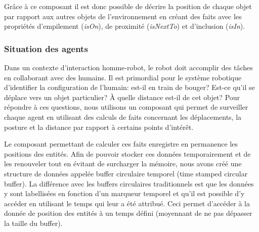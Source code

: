 \documentclass[a4paper,11pt,twoside]{StyleThese}
\begin{document}
Grâce à ce composant il est donc possible de décrire la position de chaque objet par rapport aux autres objets de l'environnement en créant des faits avec les propriétés d'empilement (\textit{isOn}), de proximité (\textit{isNextTo}) et d'inclusion (\textit{isIn}). 

\subsubsection{Situation des agents}
\label{sec:situationAgents}

Dans un contexte d'interaction homme-robot, le robot doit accomplir des tâches en collaborant avec des humains. Il est primordial pour le système robotique d'identifier la configuration de l'humain: est-il en train de bouger? Est-ce qu'il se déplace vers un objet particulier? À quelle distance est-il de cet objet? Pour répondre à ces questions, nous utilisons un composant qui permet de surveiller chaque agent en utilisant des calculs de faits concernant les déplacements, la posture et la distance par rapport à certains points d'intérêt.

Le composant permettant de calculer ces faits enregistre en permanence les positions des entités. Afin de pouvoir stocker ces données temporairement et de les renouveler tout en évitant de surcharger la mémoire, nous avons créé une structure de données appelée buffer circulaire temporel (time stamped circular buffer). La différence avec les buffers circulaires traditionnels est que les données y sont labellisées en fonction d'un marqueur temporel et qu'il est possible d'y accéder en utilisant le temps qui leur a été attribué. Ceci permet d'accéder à la donnée de position des entités à un temps défini (moyennant de ne pas dépasser la taille du buffer).
\end{document}
